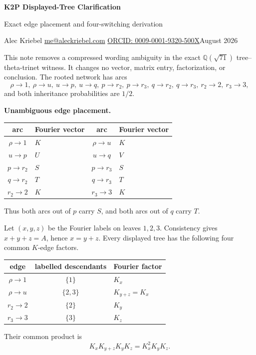 \documentclass[10pt]{article}
\begin{document}
\begin{center}
{\Large\bfseries K2P Displayed-Tree Clarification}\par
{\large Exact edge placement and four-switching derivation}\par
Alec Kriebel \quad \href{mailto:me@aleckriebel.com}{me@aleckriebel.com} \quad \href{https://orcid.org/0009-0001-9320-500X}{ORCID: 0009-0001-9320-500X}\hfill August 2026
\end{center}

This note removes a compressed wording ambiguity in the exact $\mathbb Q(\sqrt{71})$ tree--theta-trinet witness. It changes no vector, matrix entry, factorization, or conclusion. The rooted network has arcs
\[
\rho\to1,\ \rho\to u,\ u\to p,\ u\to q,\ p\to r_2,\ p\to r_3,\ q\to r_2,\ q\to r_3,\ r_2\to2,\ r_3\to3,
\]
and both inheritance probabilities are $1/2$.

\textbf{Unambiguous edge placement.}
\begin{center}
\small
\begin{tabular}{@{}cl@{\qquad}cl@{}}
\toprule
arc&Fourier vector&arc&Fourier vector\\
\midrule
$\rho\to1$&$K$&$\rho\to u$&$K$\\
$u\to p$&$U$&$u\to q$&$V$\\
$p\to r_2$&$S$&$p\to r_3$&$S$\\
$q\to r_2$&$T$&$q\to r_3$&$T$\\
$r_2\to2$&$K$&$r_3\to3$&$K$\\
\bottomrule
\end{tabular}
\end{center}
Thus both arcs out of $p$ carry $S$, and both arcs out of $q$ carry $T$.

Let $(x,y,z)$ be the Fourier labels on leaves $1,2,3$. Consistency gives $x+y+z=A$, hence $x=y+z$. Every displayed tree has the following four common $K$-edge factors.
\begin{center}
\small
\begin{tabular}{@{}ccl@{}}
\toprule
edge&labelled descendants&Fourier factor\\
\midrule
$\rho\to1$&$\{1\}$&$K_x$\\
$\rho\to u$&$\{2,3\}$&$K_{y+z}=K_x$\\
$r_2\to2$&$\{2\}$&$K_y$\\
$r_3\to3$&$\{3\}$&$K_z$\\
\bottomrule
\end{tabular}
\end{center}
Their common product is
\[
K_xK_{y+z}K_yK_z=K_x^2K_yK_z.
\]
\end{document}
